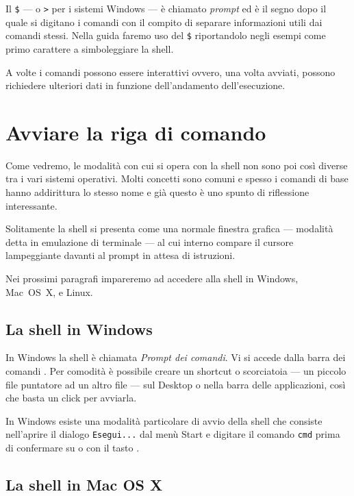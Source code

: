 Il \texttt{\$} --- o \texttt{>} per i sistemi Windows --- è chiamato \emph{prompt} ed è il segno dopo il quale si digitano i comandi con il compito di separare informazioni utili dai comandi stessi. Nella guida faremo uso del \texttt{\$} riportandolo negli esempi come primo carattere a simboleggiare la shell.

A volte i comandi possono essere interattivi ovvero, una volta avviati, possono richiedere ulteriori dati in funzione dell'andamento dell'esecuzione.

\section{Avviare la riga di comando}\label{secAvvio}

Come vedremo, le modalità con cui si opera con la shell non sono poi così diverse tra i vari sistemi operativi. Molti concetti sono comuni e spesso i comandi di base hanno addirittura lo stesso nome e già questo è uno spunto  di riflessione interessante. 

Solitamente la shell si presenta come una normale finestra grafica --- modalità detta in emulazione di terminale --- al cui interno compare il cursore lampeggiante davanti al prompt in attesa di istruzioni.

Nei prossimi paragrafi impareremo ad accedere alla shell in Windows, Mac~OS~X, e Linux.

\subsection{La shell in Windows}

In Windows la shell è chiamata \emph{Prompt dei comandi}. Vi si accede dalla barra dei comandi .
Per comodità è possibile creare un shortcut o scorciatoia --- un piccolo file puntatore ad un altro file --- sul Desktop o nella barra delle applicazioni, così che basta un click per avviarla.

In Windows esiste una modalità particolare di avvio della shell che consiste nell'aprire il dialogo \texttt{Esegui...} dal menù Start e digitare il comando \texttt{cmd} prima di confermare su  o con il tasto \keys{\return}.

\subsection{La shell in Mac OS X}

